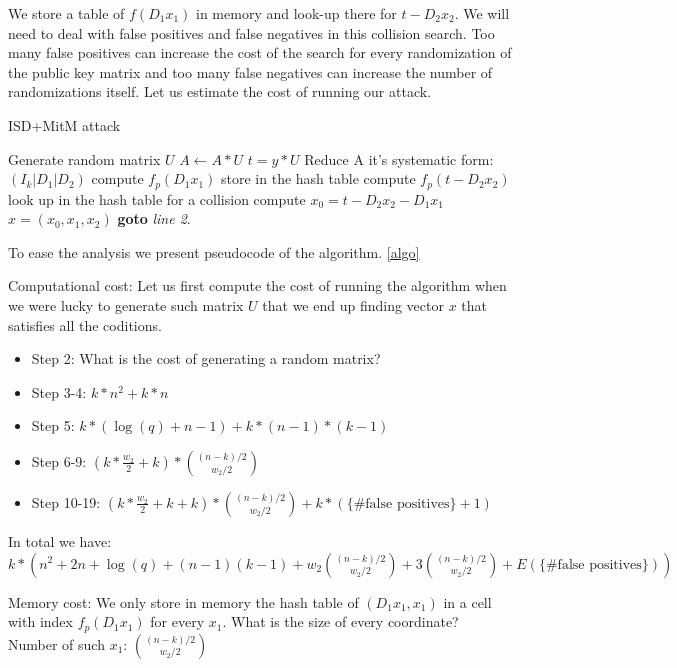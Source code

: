\documentclass[12pt]{article}
\begin{document}
We store a table of $f(D_1x_1)$ in memory and look-up there for $t - D_2x_2$. We will need to deal with false positives and false negatives in this collision search. Too many false positives can increase the cost of the search for every randomization of the public key matrix and too many false negatives can increase the number of randomizations itself. Let us estimate the cost of running our attack.
\begin{algorithm}
\caption{ISD+MitM attack}\label{algo}
\begin{algorithmic}[1]
    \State Generate random matrix $U$
    \State $A \gets A * U$
    \State $t = y * U$
    \State Reduce A it's systematic form: $(I_k |D_1|D_2)$
    \State compute $f_{p}(D_1x_1)$
    \State store in the hash table
    \EndFor
    \State compute $f_{p}(t - D_2x_2)$
    \State look up in the hash table for a collision
        \State compute $x_0 = t - D_2x_2 - D_1x_1$
        \State \Return $x = (x_0, x_1, x_2)$
        \EndIf
    \EndIf
    \EndFor
\State \textbf{goto} \emph{line 2}.
\EndProcedure
\end{algorithmic}
\end{algorithm}
To ease the analysis we present pseudocode of the algorithm. \ref{algo}

Computational cost:
Let us first compute the cost of running the algorithm when we were lucky to generate such matrix $U$ that we end up finding vector $x$ that satisfies all the coditions.
\begin{itemize}
    \item Step 2: What is the cost of generating a random matrix?
    \item Step 3-4: $k*n^2 + k*n$
    \item Step 5: $k*(\log(q) + n-1) + k*(n-1)*(k-1)$
    \item Step 6-9: $(k*\frac{w_2}{2} + k)*\binom{(n-k)/2}{w_2/2}$
    \item Step 10-19: $(k*\frac{w_2}{2} + k + k)*\binom{(n-k)/2}{w_2/2} + k*(\{\text{\# false positives}\} + 1)$
\end{itemize}
In total we have: $k*(n^2 + 2n + \log(q) + (n-1)(k-1) + w_2\binom{(n-k)/2}{w_2/2} + 3\binom{(n-k)/2}{w_2/2} + E(\{\text{\# false positives}\}))$

Memory cost:
We only store in memory the hash table of $(D_1x_1, x_1)$ in a cell with index $f_{p}(D_1x_1)$ for every $x_1$.
What is the size of every coordinate?  Number of such $x_1$: $\binom{(n-k)/2}{w_2/2}$
\end{document}

